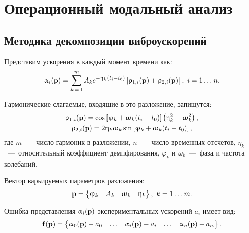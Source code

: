 \section{Операционный модальный анализ}

\subsection{Методика декомпозиции виброускорений}


Представим ускорения в каждый момент времени как:
\begin{equation}
	\upalpha_i(\mathbf{p}) = \sum\limits_{k\,=\,1} ^ m A_k e ^ {-\upeta_k (t_i - t_0)} \left[ \uprho_{1,i}(\mathbf{p}) + \uprho_{2, i}(\mathbf{p}) \right], \ i = 1 \hdots n.
\end{equation}

Гармонические слагаемые, входящие в это разложение, запишутся:
\begin{equation}
	\begin{gathered}
		\uprho_{1, i}(\mathbf{p}) = \cos \left[ \upvarphi_k + \upomega_k (t_i - t_0) \right] \left( \upeta_k ^ 2 - \upomega_k ^ 2 \right), \\
		\uprho_{2, i}(\mathbf{p}) = 2 \upeta_k \upomega_k \sin \left[ \upvarphi_k + \upomega_k (t_i - t_0) \right],
	\end{gathered}
\end{equation}
где $ m $~---~число гармоник в разложении, $ n $~---~число временных отсчетов, $ \eta_k $~---~относительный коэффициент демпфирования, $ \varphi_k $ и $ \omega_k $~---~фаза и частота колебаний. 

Вектор варьируемых параметров разложения:
\begin{equation}
	\mathbf{p} = 
	\begin{Bmatrix}
		\upvarphi_k & A_k & \upomega_k & \upeta_k
	\end{Bmatrix}, \ k = 1 \hdots m.
\end{equation}

Ошибка представления $ \upalpha_i(\mathbf{p}) $ экспериментальных ускорений $ a_i $ имеет вид:
\begin{equation}
	\mathbf{f(\mathbf{p})} = 
	\begin{Bmatrix}
		\upalpha_0(\mathbf{p}) - a_0 & \hdots & \upalpha_i(\mathbf{p}) - a_i & \hdots & \upalpha_n(\mathbf{p}) - a_n
	\end{Bmatrix}.
\end{equation}

